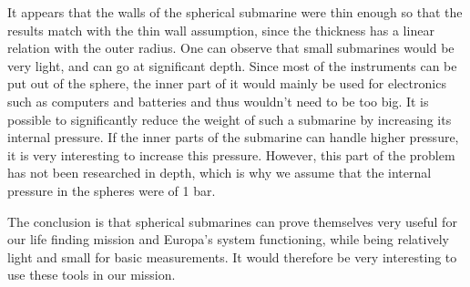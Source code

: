 \begin{figure}[H]
\centering
\captionsetup[subfigure]{width=0.45\textwidth}
\end{figure}

\noindent
It appears that the walls of the spherical submarine were thin enough so that the results match with the thin wall assumption, since the thickness has a linear relation with the outer radius.
One can observe that small submarines would be very light, and can go at significant depth. Since most of the instruments can be put out of the sphere, the inner part of it would mainly be used for electronics such as computers and batteries and thus wouldn't need to be too big. It is possible to significantly reduce the weight of such a submarine by increasing its internal pressure. If the inner parts of the submarine can handle higher pressure, it is very interesting to increase this pressure. However, this part of the problem has not been researched in depth, which is why we assume that the internal pressure in the spheres were of 1 bar.

The conclusion is that spherical submarines can prove themselves very useful for our life finding mission and Europa's system functioning, while being relatively light and small for basic measurements. It would therefore be very interesting to use these tools in our mission.
